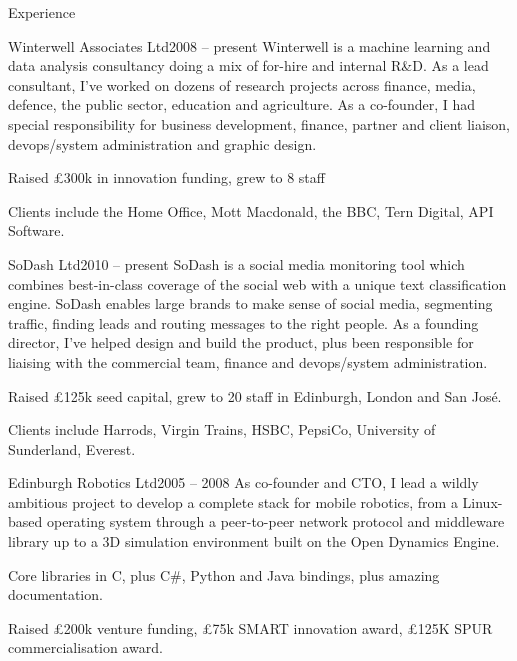 \documentclass{resume} %
\begin{document}
\begin{rSection}{Experience}

\begin{rSubsection}{Winterwell Associates Ltd}{2008 -- present}
{Winterwell is a machine learning and data analysis consultancy doing a mix of for-hire and internal R\&D.
As a lead consultant, I've worked on dozens of research projects across finance, media, defence, the public sector, education and 
agriculture. As a co-founder, I had special responsibility for business development, finance, partner and client liaison,
devops/system administration and graphic design.}{}
\item Raised £300k in innovation funding, grew to 8 staff
\item Clients include the Home Office, Mott Macdonald, the BBC, Tern Digital, API Software.
\end{rSubsection}


\begin{rSubsection}{SoDash Ltd}{2010 -- present}
{SoDash is a social media monitoring tool which combines best-in-class coverage of the social web
with a unique text classification engine. SoDash enables large brands to make sense of
social media, segmenting traffic, finding leads and routing messages to the right people.
As a founding director, I've helped design and build the product, plus been responsible for liaising with the commercial team,
finance and devops/system administration.}{}
\item Raised £125k seed capital, grew to 20 staff in Edinburgh, London and San José.
\item Clients include Harrods, Virgin Trains, HSBC, PepsiCo, University of Sunderland, Everest.
\end{rSubsection}


\begin{rSubsection}{Edinburgh Robotics Ltd}{2005 -- 2008}
{As co-founder and CTO, I lead a wildly ambitious project to develop a complete stack for mobile robotics,
from a Linux-based operating system through a peer-to-peer network protocol and middleware library up to a 3D
simulation environment built on the Open Dynamics Engine.}{} 
\item Core libraries in C, plus C\#, Python and Java bindings, plus amazing documentation.
\item Raised £200k venture funding, £75k SMART innovation award, £125K SPUR commercialisation award.
\end{rSubsection}


\end{rSection}
\end{document}
